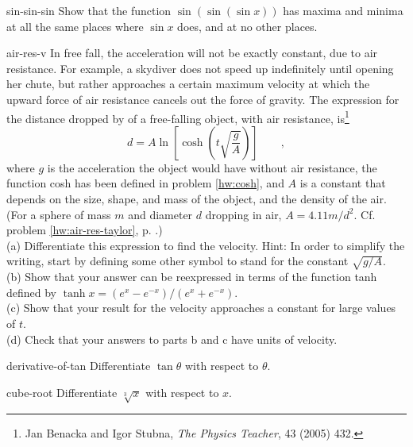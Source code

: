 \begin{hwsection}
\begin{hwwithsoln}{sin-sin-sin}
Show that the function $\sin(\sin(\sin x))$ has maxima and minima at all the same places
where $\sin x$ does, and at no other places.
\end{hwwithsoln}

\begin{hwwithsoln}{air-res-v}
In free fall, the acceleration will not be exactly constant, due to air resistance. For example,
a skydiver does not speed up indefinitely until opening her chute, but rather approaches a certain
maximum velocity at which the upward force of air resistance cancels out the force of gravity.
The expression for the distance dropped by of a free-falling object, with air resistance, is\footnote{Jan Benacka
and Igor Stubna, \emph{The Physics Teacher}, 43 (2005) 432.}
\begin{equation*}
  d = A \ln\left[\cosh\left(t\sqrt{\frac{g}{A}}\right)\right] \qquad ,
\end{equation*}
where $g$ is the acceleration the object would have without air resistance, the function cosh
has been defined in problem \ref{hw:cosh}, and
$A$ is a constant that depends on the size, shape, and mass of the object, and the density of
the air. (For a sphere of mass $m$ and diameter $d$ dropping in air, $A=4.11m/d^2$.
Cf. problem \ref{hw:air-res-taylor}, p. \pageref{hw:air-res-taylor}.)\\
(a) Differentiate this expression to find the velocity.  Hint: In order to simplify the writing,
start by defining some other symbol to stand for the constant $\sqrt{g/A}$.\\
(b) Show that your answer can be reexpressed in terms of the function tanh defined by
$\tanh x=(e^x-e^{-x})/(e^x+e^{-x})$.\\
(c) Show that your result for the velocity approaches
a constant for large values of $t$.\\
(d) Check that your answers to parts b and c have units of velocity.
\end{hwwithsoln}

\begin{hwwithsoln}{derivative-of-tan}
Differentiate $\tan\theta$ with respect to $\theta$.
\end{hwwithsoln}

\begin{hwwithsoln}{cube-root}
Differentiate $\sqrt[3]{x}$ with respect to $x$.
\end{hwwithsoln}


\end{hwsection}
